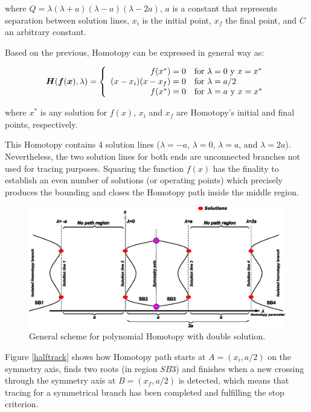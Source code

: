 \documentclass[conference,letterpaper,onecolumn]{IEEEtran}
\newcommand{\pig}[1]{\mbox{\boldmath ${#1}$}	}
\begin{document}
where {\small $Q=\lambda(\lambda+a)(\lambda-a)(\lambda-2a)$}, $a$ is a constant that represents separation between solution lines, $x_i$ is the initial point, $x_f$ the final point, and $C$ an arbitrary constant.

Based on the previous, Homotopy can be expressed in general way as:

\begin{displaymath}
\pig{H}(\pig{f}(\pig{x}),\lambda ) = \left\{\begin{array}{rl}
f(x^*)=0 & \textrm{for $\lambda=0$ y $x=x^*$}\\
(x-x_i)(x-x_f)=0 & \textrm{for $\lambda=a/2$}\\
f(x^*)=0 & \textrm{for $\lambda=a$ y $x=x^*$}
\end{array}\right.
\end{displaymath}

where $x^*$ is any solution for $f(x)$, $x_i$ and  $x_f$ are Homotopy's initial and final points, respectively.

This Homotopy contains 4 solution lines ($\lambda=-a$, $\lambda=0$, $\lambda=a$, and $\lambda=2a$). Nevertheless, the two solution lines for both ends are unconnected branches not used for tracing purposes. Squaring the function $f(x)$ has the finality to establish an even number of solutions (or operating points) which precisely produces the bounding and closes the Homotopy path inside the middle region.

\begin{figure}[tbp]
{\tiny  
\centerline{
\centering
\includegraphics[width=14cm]{figs/doblelineapoli.eps}}}
\caption{General scheme for polynomial Homotopy with double solution.}
\label{doblehp}
\end{figure}

Figure \ref{halftrack} shows how Homotopy path starts at $A=(x_i,a/2)$ on the symmetry axis, finds two roots (in region $SB3$) and finishes when a new crossing through the symmetry axis at $B=(x_f,a/2)$ is detected, which means that tracing for a symmetrical branch has been completed and fulfilling the stop criterion.
\end{document}
